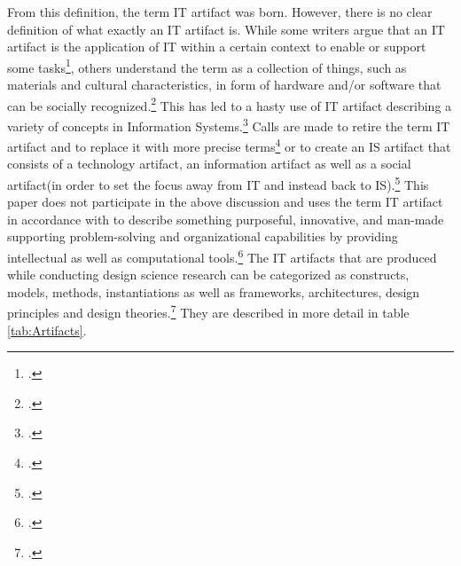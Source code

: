 From this definition, the term IT artifact was born. However, there is no clear definition of what exactly an IT artifact is. While some writers argue that an IT artifact is the application of IT within a certain context to enable or support some tasks\footcites[Cf.][p.186]{BenbasatEmpiricalresearchinformation1999}[cf.][p.50]{AlterconceptITartifact2015}, others understand the term as a collection of things, such as materials and cultural characteristics, in form of hardware and/or software that can be socially recognized.\footcite[Cf.][p.121]{OrlikowskiResearchCommentaryDesperately2001} This has led to a hasty use of IT artifact describing a variety of concepts in Information Systems.\footcite[Cf.][p.49]{AlterconceptITartifact2015} Calls are made to retire the term IT artifact and to replace it with more precise terms\footcite[Cf.][p.59]{AlterconceptITartifact2015} or to create an IS artifact that consists of a technology artifact, an information artifact as well as a social artifact(in order to set the focus away from IT and instead back to IS).\footcite[Cf.][pp.1,6]{LeeGoingbackbasics2015} This paper does not participate in the above discussion and uses the term IT artifact in accordance with \cite{HevnerDesignScienceResearch2004} to describe something purposeful, innovative, and man-made supporting problem-solving and organizational capabilities by providing intellectual as well as computational tools.\footcites[Cf.][pp.76,82]{HevnerDesignScienceResearch2004}[cf.][p.340]{GregorPositioningpresentingdesign2013}
The IT artifacts that are produced while conducting design science research can be categorized as constructs, models, methods, instantiations as well as frameworks, architectures, design principles and design theories.\footcites[Cf.][pp.256-258]{MarchDesignnaturalscience1995}[cf.][p.343]{GregorPositioningpresentingdesign2013}[cf.][p.50]{PuraoDesignResearchTechnology2002} [cf.][p.77]{HevnerDesignResearchInformation2010} They are described in more detail in table \ref{tab:Artifacts}. 

